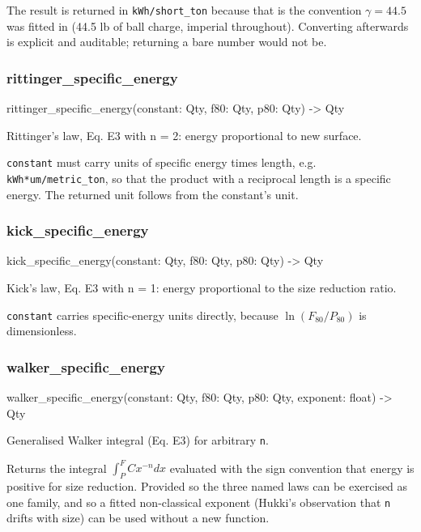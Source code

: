 \documentclass[10pt,a4paper,twoside]{report}
\begin{document}
The result is returned in \texttt{kWh/short\_ton} because that is the convention $\gamma = 44.5$ was fitted in (44.5 lb of ball charge, imperial throughout). Converting afterwards is explicit and auditable; returning a bare number would not be.

\subsubsection*{rittinger\_specific\_energy}

\begin{verbatimsmall}
rittinger_specific_energy(constant: Qty, f80: Qty, p80: Qty) -> Qty
\end{verbatimsmall}

Rittinger's law, Eq. E3 with n = 2: energy proportional to new surface.

\texttt{constant} must carry units of specific energy times length, e.g. \texttt{kWh*um/metric\_ton}, so that the product with a reciprocal length is a specific energy. The returned unit follows from the constant's unit.

\subsubsection*{kick\_specific\_energy}

\begin{verbatimsmall}
kick_specific_energy(constant: Qty, f80: Qty, p80: Qty) -> Qty
\end{verbatimsmall}

Kick's law, Eq. E3 with n = 1: energy proportional to the size reduction ratio.

\texttt{constant} carries specific-energy units directly, because $\ln(F_{80}/P_{80})$ is dimensionless.

\subsubsection*{walker\_specific\_energy}

\begin{verbatimsmall}
walker_specific_energy(constant: Qty, f80: Qty, p80: Qty, exponent: float) -> Qty
\end{verbatimsmall}

Generalised Walker integral (Eq. E3) for arbitrary \texttt{n}.

Returns the integral $\int_{P}^{F} C x^{-n} dx$ evaluated with the sign convention that energy is positive for size reduction. Provided so the three named laws can be exercised as one family, and so a fitted non-classical exponent (Hukki's observation that \texttt{n} drifts with size) can be used without a new function.
\end{document}
